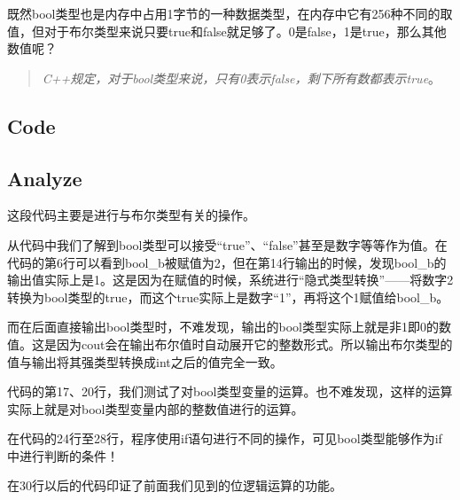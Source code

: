 既然bool类型也是内存中占用1字节的一种数据类型，在内存中它有256种不同的取值，但对于布尔类型来说只要true和false就足够了。0是false，1是true，那么其他数值呢？
\begin{quote}
	\emph{C++规定，对于bool类型来说，只有0表示false，剩下所有数都表示true}。
\end{quote}

\subsection{Code}



\subsection{Analyze}
\showremarks
这段代码主要是进行与布尔类型有关的操作。

从代码中我们了解到bool类型可以接受“true”、“false”甚至是数字等等作为值。在代码的第6行可以看到bool\_b被赋值为2，但在第14行输出的时候，发现bool\_b的输出值实际上是1。这是因为在赋值的时候，系统进行“隐式类型转换”——将数字2转换为bool类型的true，而这个true实际上是数字“1”，再将这个1赋值给bool\_b。

而在后面直接输出bool类型时，不难发现，输出的bool类型实际上就是非1即0的数值。这是因为cout会在输出布尔值时自动展开它的整数形式。所以输出布尔类型的值与输出将其强类型转换成int之后的值完全一致。

代码的第17、20行，我们测试了对bool类型变量的运算。也不难发现，这样的运算实际上就是对bool类型变量内部的整数值进行的运算。

在代码的24行至28行，程序使用if语句进行不同的操作，可见bool类型能够作为if中进行判断的条件！

在30行以后的代码印证了前面我们见到的位逻辑运算的功能。

